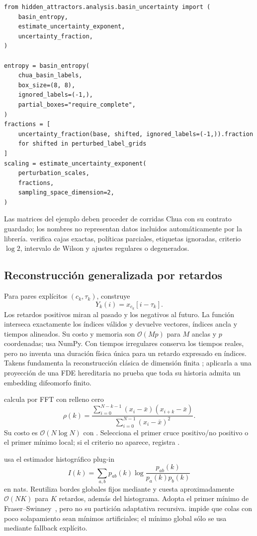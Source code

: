 \begin{verbatim}
from hidden_attractors.analysis.basin_uncertainty import (
    basin_entropy,
    estimate_uncertainty_exponent,
    uncertainty_fraction,
)

entropy = basin_entropy(
    chua_basin_labels,
    box_size=(8, 8),
    ignored_labels=(-1,),
    partial_boxes="require_complete",
)
fractions = [
    uncertainty_fraction(base, shifted, ignored_labels=(-1,)).fraction
    for shifted in perturbed_label_grids
]
scaling = estimate_uncertainty_exponent(
    perturbation_scales,
    fractions,
    sampling_space_dimension=2,
)
\end{verbatim}
Las matrices del ejemplo deben proceder de corridas Chua con su contrato
guardado; los nombres no representan datos incluidos automáticamente por la
librería.  verifica cajas exactas,
 políticas parciales, etiquetas ignoradas, criterio \(\log 2\), intervalo de
Wilson y ajustes regulares o degenerados.

\subsection{Reconstrucción generalizada por retardos}
\label{sec:delay-embedding-advanced}

Para pares explícitos \((c_k,\tau_k)\),
 construye
\[
 Y_k(i)=x_{c_k}[i-\tau_k].
\]
Los retardos positivos miran al pasado y los negativos al futuro. La función
interseca exactamente los índices válidos y devuelve vectores, índices ancla y
tiempos alineados. Su costo y memoria son \(\mathcal O(Mp)\) para \(M\) anclas y \(p\)
coordenadas; usa NumPy. Con tiempos irregulares conserva los tiempos reales,
pero no inventa una duración física única para un retardo expresado en índices.
Takens fundamenta la reconstrucción clásica de dimensión finita
\cite{Takens1981}; aplicarla a una proyección de una FDE hereditaria no prueba
que toda su historia admita un embedding difeomorfo finito.

 calcula por FFT con relleno cero
\[
 \rho(k)=
 \frac{\sum_{i=0}^{N-k-1}(x_i-\bar x)(x_{i+k}-\bar x)}
      {\sum_{i=0}^{N-1}(x_i-\bar x)^2}.
\]
Su costo es \(\mathcal O(N\log N)\) con . Selecciona el primer cruce positivo/no positivo o
el primer mínimo local; si el criterio no aparece, registra
.

 usa el estimador histográfico
plug-in
\[
 I(k)=\sum_{a,b}p_{ab}(k)
 \log\frac{p_{ab}(k)}{p_a(k)p_b(k)}
\]
en nats. Reutiliza bordes globales fijos mediante
 y cuesta aproximadamente \(\mathcal O(NK)\) para
\(K\) retardos, además del histograma. Adopta el primer mínimo de
Fraser--Swinney~\cite{FraserSwinney1986}, pero no su partición adaptativa
recursiva.  impide que colas con poco solapamiento sean
mínimos artificiales; el mínimo global sólo se usa mediante fallback explícito.

